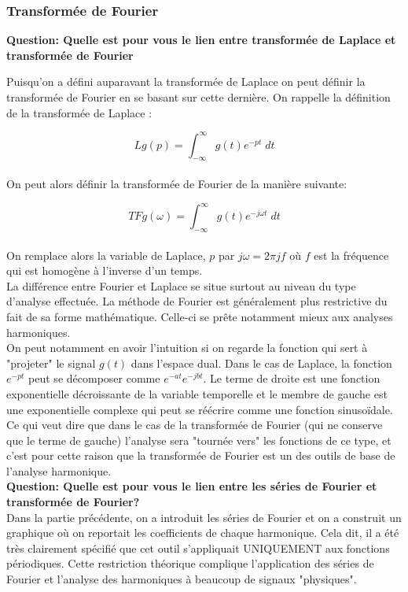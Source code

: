 \documentclass[11pt,a4paper]{article}
\begin{document}
\subsubsection{Transformée de Fourier}

\textbf{Question: Quelle est pour vous le lien entre transformée de Laplace et transformée de Fourier}

Puisqu'on a défini auparavant la transformée de Laplace on peut définir la transformée de Fourier en se basant sur cette dernière. On rappelle la définition de la transformée de Laplace :

\[L{g}(p) = \int^{\infty}_{-\infty} g(t) e^{-pt} \; dt\]\\ 

On peut alors définir la transformée de Fourier de la manière suivante:

\[TF{g}(\omega) = \int^{\infty}_{-\infty} g(t) e^{-j\omega t} \; dt\]\\

On remplace alors la variable de Laplace, $p$ par  $j \omega = 2 \pi j f$ où $f$  est la fréquence qui est homogène à l'inverse d'un temps.\\

La différence entre Fourier et Laplace se situe surtout au niveau du type  d'analyse effectuée. La méthode de Fourier est généralement plus restrictive du fait de sa forme mathématique. Celle-ci se prête notamment mieux aux analyses harmoniques.\\

On peut notamment en avoir l'intuition si on regarde la fonction qui sert à "projeter" le signal $g(t)$ dans l'espace dual. Dans le cas de Laplace, la fonction $e^{-pt}$ peut se décomposer comme $e^{-at}e^{-jbt}$. Le terme de droite est une fonction exponentielle décroissante de la variable temporelle et le membre de gauche est une exponentielle complexe qui peut se réécrire comme une fonction sinusoïdale. Ce qui veut dire que dans le cas de la transformée de Fourier (qui ne conserve que le terme de gauche) l'analyse sera "tournée vers" les fonctions de ce type, et c'est pour cette raison que la transformée de Fourier est un des outils de base de l'analyse harmonique. \\

\textbf{Question: Quelle est pour vous le lien entre les séries de Fourier et transformée de Fourier?} \\

Dans la partie précédente, on a introduit les séries de Fourier et on a construit un graphique où on reportait les coefficients de chaque harmonique. Cela dit, il a été très clairement spécifié que cet outil s'appliquait UNIQUEMENT aux fonctions périodiques. Cette restriction théorique complique l'application des séries de Fourier et l'analyse des harmoniques à beaucoup de signaux "physiques".\\
\end{document}
